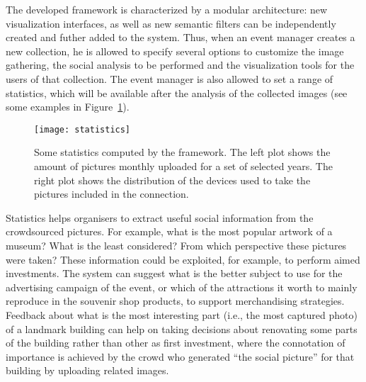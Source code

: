 The developed framework is characterized by a modular architecture: new visualization interfaces, as well as new semantic filters can be independently created and futher added to the system. 
Thus, when an event manager creates a new collection, he is allowed to specify several options to customize the image gathering, the social analysis to be performed and the visualization tools for the users of that collection.
The event manager is also allowed to set a range of statistics, which will be available after the analysis of the collected images (see some examples in Figure~\ref{figStatistics}). 
\begin{figure}[t]
	\centering
	\texttt{[image: statistics]}
	\caption{Some statistics computed by the framework. The left plot shows the amount of pictures monthly uploaded for a set of selected years. The right plot shows the distribution of the devices used to take the pictures included in the connection.}
	\label{figStatistics}
\end{figure}
Statistics helps organisers to extract useful social information from the crowdsourced pictures.%
For example, what is the most popular artwork of a museum? What is the least considered? From which perspective these pictures were taken?
These information could be exploited, for example, to perform aimed investments. The system can suggest what is the better subject to use for the advertising campaign of the event, or which of the attractions it worth to mainly reproduce in the souvenir shop products, to support merchandising strategies. Feedback about what is the most interesting part (i.e., the most captured photo) of a landmark building can help on taking decisions about renovating some parts of the building rather than other as first investment, where the connotation of importance is achieved by the crowd who generated ``the social picture'' for that building by uploading related images.



